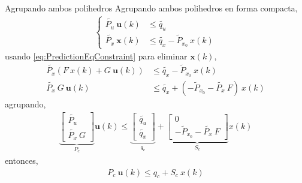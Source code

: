 \documentclass[8pt]{beamer}
\begin{document}
\begin{frame}[fragile]{Agrupando ambos polihedros}
	Agrupando ambos polihedros en forma compacta,
	\begin{align*}
	\begin{cases}
		\tilde{P_u}~\mathbf{u}(k) & \leq \tilde{q_u}                      \\
		\tilde{P_x}~\mathbf{x}(k) & \leq \tilde{q_x}-\tilde{P}_{x_0}~x(k)
	\end{cases}
	\end{align*}
	usando \eqref{eq:PredictionEqConstraint} para eliminar $\mathbf{x}(k)$,
	\begin{align*}
		\tilde{P_x}(F~x(k)+G~\mathbf{u}(k)) & \leq \tilde{q_x}-\tilde{P}_{x_0}~x(k)                  \\
		\tilde{P_x}~G~\mathbf{u}(k)         & \leq \tilde{q_x}+(-\tilde{P}_{x_0}-\tilde{P_x}~F)~x(k)
	\end{align*}
	agrupando,
	\begin{equation}
	\begin{aligned}
		\underbrace{
			\begin{bmatrix}
			\tilde{P_u}\\
			\tilde{P_x}~G
			\end{bmatrix}
		}_{P_c}
		\mathbf{u}(k)
		\leq
		\underbrace{
			\begin{bmatrix}
			\tilde{q_u}\\
			\tilde{q_x}
			\end{bmatrix}
		}_{q_c}
		+
		\underbrace{
			\begin{bmatrix}
			0\\
			-\tilde{P}_{x_0}-\tilde{P_x}~F
			\end{bmatrix}
		}_{S_c}
		x(k)
	\end{aligned}
	\end{equation}
	entonces,
	\begin{align}\label{eq:ConstraintPredicedtMatrices}
	P_c~\mathbf{u}(k) \leq q_c+S_c~x(k)
	\end{align}
		

\end{frame}
\end{document}
